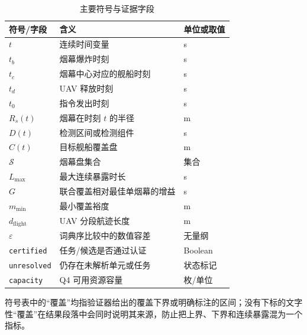 \begin{table}[!htbp]
\centering
\caption{主要符号与证据字段}
\label{tab:symbols}
\begin{tabularx}{\textwidth}{>{\centering\arraybackslash}p{} X >{\centering\arraybackslash}p{}}
\toprule
符号/字段 & 含义 & 单位或取值 \\
\midrule
$t$ & 连续时间变量 & s \\
$t_b$ & 烟幕爆炸时刻 & s \\
$t_c$ & 烟幕中心对应的舰船时刻 & s \\
$t_d$ & UAV 释放时刻 & s \\
$t_0$ & 指令发出时刻 & s \\
$R_s(t)$ & 烟幕在时刻 $t$ 的半径 & m \\
$D(t)$ & 检测区间或检测组件 & s \\
$C(t)$ & 目标舰船覆盖盘 & m \\
$\mathcal{S}$ & 烟幕盘集合 & 集合 \\
$L_{\max}$ & 最大连续暴露时长 & s \\
$G$ & 联合覆盖相对最佳单烟幕的增益 & s \\
$m_{\min}$ & 最小覆盖裕度 & m \\
$d_{\mathrm{flight}}$ & UAV 分段航迹长度 & m \\
$\varepsilon$ & 词典序比较中的数值容差 & 无量纲 \\
\texttt{certified} & 任务/候选是否通过认证 & Boolean \\
\texttt{unresolved} & 仍存在未解析单元或任务 & 状态标记 \\
\texttt{capacity} & Q4 可用资源容量 & 枚/单位 \\
\bottomrule
\end{tabularx}
\end{table}

符号表中的“覆盖”均指验证器给出的覆盖下界或明确标注的区间；没有下标的文字性“覆盖”在结果段落中会同时说明其来源，防止把上界、下界和连续暴露混为一个指标。
